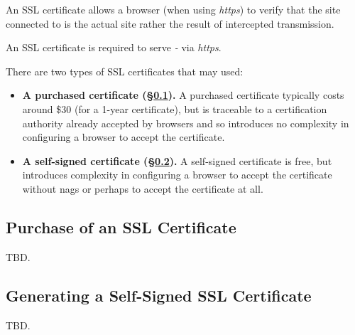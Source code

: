 An SSL certificate allows a browser (when using \emph{https}) to verify that
the site connected to is the actual site rather the result of intercepted
transmission.

An SSL certificate is required to serve \emph{\productbasename{}-\productversion{}}
via \emph{https}.

There are two types of SSL certificates that may used:

\begin{itemize}
\item \textbf{A purchased certificate (\S\ref{cist0:sgsl0:spsl0})\@.}
      A purchased certificate typically costs around \$30 (for a 1-year
      certificate), but is traceable to a certification authority already
      accepted by browsers and so introduces no complexity in configuring
      a browser to accept the certificate.
\item \textbf{A self-signed certificate (\S\ref{cist0:sgsl0:sgss0})\@.}
      A self-signed certificate is free, but introduces complexity in
      configuring a browser to accept the certificate without nags or
      perhaps to accept the certificate at all.
\end{itemize}


\subsection{Purchase of an SSL Certificate}
\label{cist0:sgsl0:spsl0}

TBD.


\subsection{Generating a Self-Signed SSL Certificate}
\label{cist0:sgsl0:sgss0}

TBD.


